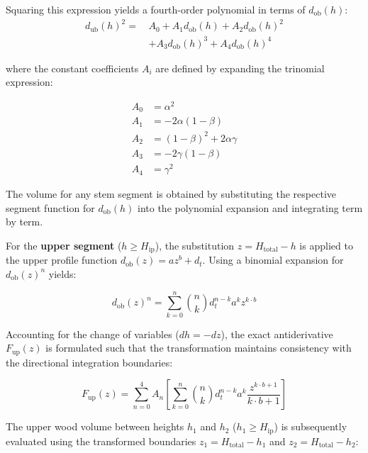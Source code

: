 \documentclass[twocolumn, bibliography=totoc]{scrartcl}
\begin{document}
Squaring this expression yields a fourth-order polynomial in terms of $d_{\text{ob}}(h)$:
\begin{equation}
\begin{aligned}
d_{\text{ub}}(h)^2 = \,& A_0 + A_1 d_{\text{ob}}(h) + A_2 d_{\text{ob}}(h)^2 \\
& + A_3 d_{\text{ob}}(h)^3 + A_4 d_{\text{ob}}(h)^4
\end{aligned}
\end{equation}

where the constant coefficients $A_i$ are defined by expanding the trinomial expression:

\begin{align}
    A_0 &= \alpha^2 \\
    A_1 &= -2\alpha(1-\beta) \\
    A_2 &= (1-\beta)^2 + 2\alpha\gamma \\
    A_3 &= -2\gamma(1-\beta) \\
    A_4 &= \gamma^2
\end{align}

The volume for any stem segment is obtained by substituting the respective segment function for $d_{\text{ob}}(h)$ into the polynomial expansion and integrating term by term.

For the \textbf{upper segment} ($h \ge H_{\text{ip}}$), the substitution $z = H_{\text{total}} - h$ is applied to the upper profile function $d_{\text{ob}}(z) = a z^b + d_t$. Using a binomial expansion for $d_{\text{ob}}(z)^n$ yields:

\begin{equation}
    d_{\text{ob}}(z)^n = \sum_{k=0}^{n} \binom{n}{k} d_t^{n-k} a^k z^{k \cdot b}
\end{equation}

Accounting for the change of variables ($dh = -dz$), the exact antiderivative $F_{\text{up}}(z)$ is formulated such that the transformation maintains consistency with the directional integration boundaries:

\begin{equation}
    F_{\text{up}}(z) = \sum_{n=0}^{4} A_n \left[ \sum_{k=0}^{n} \binom{n}{k} d_t^{n-k} a^k \frac{z^{k \cdot b + 1}}{k \cdot b + 1} \right]
\end{equation}

The upper wood volume between heights $h_1$ and $h_2$ ($h_1 \ge H_{\text{ip}}$) is subsequently evaluated using the transformed boundaries $z_1 = H_{\text{total}} - h_1$ and $z_2 = H_{\text{total}} - h_2$:
\end{document}
